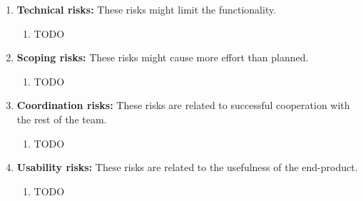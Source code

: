 \documentclass{llncs}
\begin{document}
\begin{enumerate}
	\item \textbf{Technical risks:} These risks might limit the functionality.
		\begin{enumerate}
			\item TODO
		\end{enumerate}
	\item \textbf{Scoping risks:} These risks might cause more effort than planned.
		\begin{enumerate}
			\item TODO
		\end{enumerate}
	\item \textbf{Coordination risks:} These risks are related to successful cooperation with the rest of the team.
		\begin{enumerate}
			\item TODO
		\end{enumerate}
	\item \textbf{Usability risks:} These risks are related to the usefulness of the end-product.
		\begin{enumerate}
			\item TODO
		\end{enumerate}
\end{enumerate}
\end{document}
